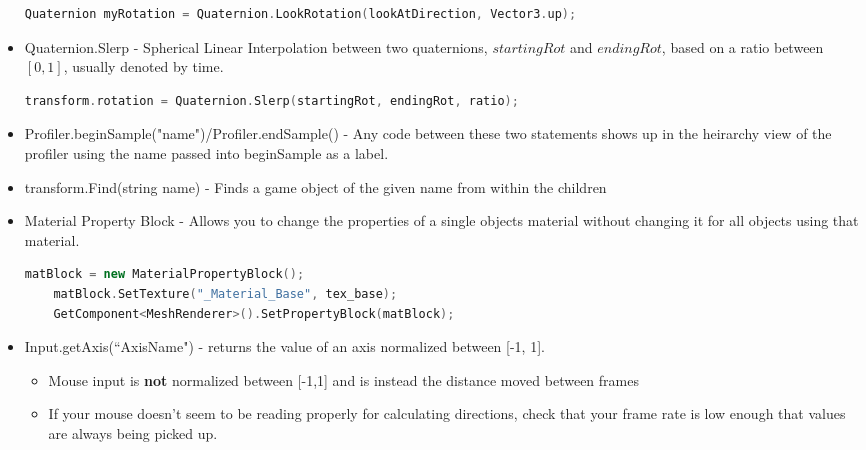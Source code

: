 \documentclass{article}
\begin{document}
\begin{itemize}
    \begin{lstlisting}[language=C++]
                Quaternion myRotation = Quaternion.LookRotation(lookAtDirection, Vector3.up); \end{lstlisting}
    \item Quaternion.Slerp - Spherical Linear Interpolation between two quaternions, $startingRot$ and $endingRot$, based on a ratio between $[0,1]$, usually denoted by time.
    \begin{lstlisting}[language=C++]
                transform.rotation = Quaternion.Slerp(startingRot, endingRot, ratio); \end{lstlisting}
    \item Profiler.beginSample("name")/Profiler.endSample() - Any code between these two statements shows up in the heirarchy view of the profiler using the name passed into beginSample as a label.
    \item transform.Find(string name) - Finds a game object of the given name from within the children
    \item Material Property Block - Allows you to change the properties of a single objects material without changing it for all objects using that material.
    \begin{lstlisting}[language=C++]
    matBlock = new MaterialPropertyBlock();
    matBlock.SetTexture("_Material_Base", tex_base);
    GetComponent<MeshRenderer>().SetPropertyBlock(matBlock);\end{lstlisting}
    \item Input.getAxis(``AxisName") - returns the value of an axis normalized between [-1, 1].
    \begin{itemize}
        \item Mouse input is \textbf{not} normalized between [-1,1] and is instead the distance moved between frames
        \item If your mouse doesn't seem to be reading properly for calculating directions, check that your frame rate is low enough that values are always being picked up.
    \end{itemize}
\end{itemize}
\end{document}

